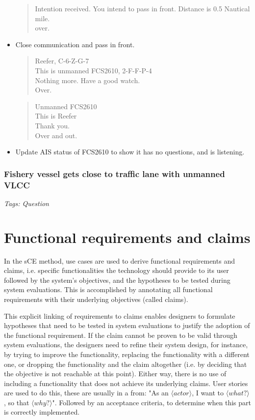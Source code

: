 \begin{itemize}
\begin{quote}
			Intention received. You intend to pass in front. Distance is 0.5 Nautical mile.\\
			over.
		\end{quote}
	\item Close communication and pass in front.
		\begin{quote}
			Reefer, C-6-Z-G-7\\
			This is unmanned FCS2610, 2-F-F-P-4 \\
			Nothing more. Have a good watch. \\
			Over.
		\end{quote}
		\begin{quote}
			Unmanned FCS2610\\
			This is Reefer\\
			Thank you. \\
			Over and out.
		\end{quote}
	\item Update AIS status of FCS2610 to show it has no questions, and is listening.
\end{itemize}

\subsubsection{Fishery vessel gets close to traffic lane with unmanned VLCC}
\emph{Tags: Question}

\section{Functional requirements and claims}
In the sCE method, use cases are used to derive functional requirements and claims, i.e. specific functionalities the technology should provide to its user followed by the system’s objectives, and the hypotheses to be tested during system evaluations. This is accomplished by annotating all functional requirements with their underlying objectives (called claims).

This explicit linking of requirements to claims enables designers to formulate hypotheses that need to be tested in system evaluations to justify the adoption of the functional requirement. If the claim cannot be proven to be valid through system evaluations, the designers need to refine their system design, for instance, by trying to improve the functionality, replacing the functionality with a different one, or dropping the functionality and the claim altogether (i.e. by deciding that the objective is not reachable at this point). Either way, there is no use of including a functionality that does not achieve its underlying claims. User stories are used to do this, these are usually in a from: "As an $\langle actor \rangle$, I want to $\langle what? \rangle$, so that $\langle why? \rangle$". Followed by an acceptance criteria, to determine when this part is correctly implemented.

